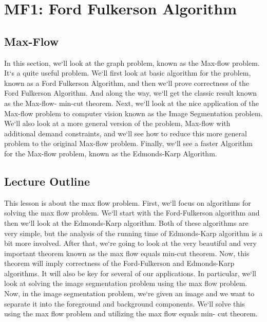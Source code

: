 \section{MF1: Ford Fulkerson Algorithm}

\subsection{Max-Flow}
In this section, we`ll look at the graph problem, known as the Max-flow problem.
It`s a quite useful problem.
We`ll first look at basic algorithm for the problem, known as a Ford Fulkerson Algorithm, and then we`ll prove correctness of the Ford Fulkerson Algorithm.
And along the way, we`ll get the classic result known as the Max-flow- min-cut theorem.
Next, we`ll look at the nice application of the Max-flow problem to computer vision known as the Image Segmentation problem.
We`ll also look at a more general version of the problem, Max-flow with additional demand constraints, and we`ll see how to reduce this more general problem to the original Max-flow problem.
Finally, we`ll see a faster Algorithm for the Max-flow problem, known as the Edmonds-Karp Algorithm.

\subsection{Lecture Outline}
This lesson is about the max flow problem.
First, we`ll focus on algorithms for solving the max flow problem.
We`ll start with the Ford-Fulkerson algorithm and then we`ll look at the Edmonds-Karp algorithm.
Both of these algorithms are very simple, but the analysis of the running time of Edmonds-Karp algorithm is a bit more involved.
After that, we`re going to look at the very beautiful and very important theorem known as the max flow equals min-cut theorem.
Now, this theorem will imply correctness of the Ford-Fulkerson and Edmonds-Karp algorithms.
It will also be key for several of our applications.
In particular, we`ll look at solving the image segmentation problem using the max flow problem.
Now, in the image segmentation problem, we`re given an image and we want to separate it into the foreground and background components.
We`ll solve this using the max flow problem and utilizing the max flow equals min- cut theorem.

